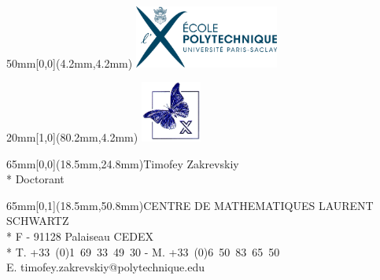 \documentclass{article}
\makeatletter
\newcommand{\phonei}{T. +33~(0)1~69~33~49~30 - M.  +33~(0)6~50~83~65~50}%
\newcommand{\emailii}{timofey.zakrevskiy@polytechnique.edu}
\makeatother
\begin{document}
%
\begin{textblock*}{50mm}[0,0](4.2mm,4.2mm)%
\noindent%
\includegraphics[height=20.6mm]{LogohorEPS.eps}%
\end{textblock*}%
\begin{textblock*}{20mm}[1,0](80.2mm,4.2mm)%
\noindent%
\includegraphics[height=20mm]{LogoCMLSTZ.png}%
\end{textblock*}%
\setmainfont{EB Garamond}%
\fontsize{12}{14.4}\selectfont%
\begin{textblock*}{65mm}[0,0](18.5mm,24.8mm){\color{bl}\noindent Timofey Zakrevskiy\\*%
\setmainfont{EB Garamond}%
\fontsize{7}{7.5}\selectfont%
Doctorant%
}\end{textblock*} %
\setmainfont{TeX Gyre Adventor}%
 \fontsize{5.5}{7.5}\selectfont%
\begin{textblock*}{65mm}[0,1](18.5mm,50.8mm){\color{bl}\noindent CENTRE DE MATHEMATIQUES LAURENT SCHWARTZ\\*%
F - 91128 Palaiseau CEDEX\\*%
\phonei\\%
E. \emailii}\end{textblock*}%
\end{document}
